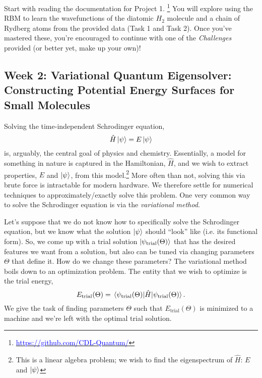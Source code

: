 \documentclass[12pt]{article}
\begin{document}
Start with reading the documentation for Project 1.
\footnote{\href{https://github.com/CDL-Quantum/CohortProject_2020/tree/master/Project_1_RBM_and_Tomography}
    {\textcolor{blue}{https://github.com/CDL-Quantum/}}}
You will explore using the RBM to learn the wavefunctions of the diatomic $H_2$ molecule
and a chain of Rydberg atoms from the provided data (Task 1 and Task 2).
Once you've mastered these, you're encouraged to continue with one of the {\it Challenges} provided (or better yet, make up your own)!

\newpage


\subsection{Week 2: Variational Quantum Eigensolver: Constructing Potential Energy Surfaces for Small Molecules}

Solving the time-independent Schrodinger equation,
\begin{equation}
    \hat{H}\ket{\psi} = E\ket{\psi}
\end{equation}
is, arguably, the central goal of physics and chemistry. Essentially, a model for something in nature is captured in the Hamiltonian, $\hat{H}$, and we wish to extract properties, $E$ and $\ket{\psi}$, from this model.\footnote{This is a linear algebra problem; we wish to find the eigenspectrum of $\hat{H}$: $E$ and $\ket{\psi}$} More often than not, solving this via brute force is intractable for modern hardware. We therefore settle for numerical techniques to approximately/exactly solve this problem. One very common way to solve the Schrodinger equation is via the {\it variational method}.

Let's suppose that we do not know how to specifically solve the Schrodinger equation, but we know what the solution $\ket{\psi}$ should ``look'' like (i.e. its functional form).
So, we come up with a trial solution $\ket{\psi_{\text{trial}}(\Theta)}$ that has the desired features we want from a solution, but also can be tuned via changing parameters $\Theta$ that define it.
How do we change these parameters?
The variational method boils down to an optimization problem.
The entity that we wish to optimize is the trial energy,
\begin{equation}
    E_{\text{trial}}(\Theta) = \mel{\psi_{\text{trial}}(\Theta)}{\hat{H}}{\psi_{\text{trial}}(\Theta)}.
\end{equation}
We give the task of finding parameters $\Theta$ such that $E_{\text{trial}}(\Theta)$ is minimized to a machine and we're left with the optimal trial solution.
\end{document}

